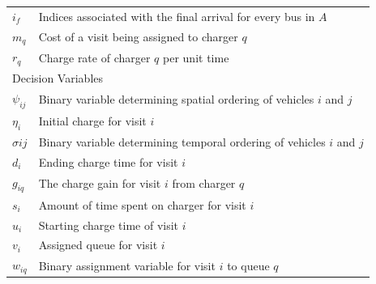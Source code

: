 \documentclass[ee,msthesis]{usuthesis}
\begin{document}
\begin{table}[!htpb]
\begin{tabularx}{\textwidth}{l l}
    $i_f$ & Indices associated with the final arrival for every bus in $A$                                                 \\
    $m_q$ & Cost of a visit being assigned to charger $q$                                                                  \\
    $r_q$ & Charge rate of charger $q$ per unit time                                                                       \\
    \hline
    \multicolumn{2}{l}{Decision Variables}                                                                                 \\
    $\psi_{ij}$ & Binary variable determining spatial ordering of vehicles $i$ and $j$                                       \\
    $\eta_i$    & Initial charge for visit $i$                                                                                \\
    $\sigma{ij}$ & Binary variable determining temporal ordering of vehicles $i$ and $j$                                       \\
    $d_i$    & Ending charge time for visit $i$                                                                            \\
    $g_{iq}$ & The charge gain for visit $i$ from charger $q$                                                              \\
    $s_i$    & Amount of time spent on charger for visit $i$                                                               \\
    $u_i$    & Starting charge time of visit $i$                                                                           \\
    $v_i$    & Assigned queue for visit $i$                                                                                \\
    $w_{iq}$ & Binary assignment variable for visit $i$ to queue $q$                                                       \\
    \bottomrule
  \end{tabularx}
\end{table}
\end{document}
